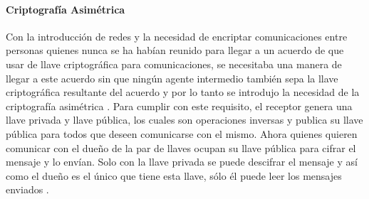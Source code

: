 \paragraph{Criptografía Asimétrica}
Con la introducción de redes y la necesidad de encriptar comunicaciones entre personas quienes nunca se ha habían reunido para llegar a un acuerdo de que usar de llave criptográfica para comunicaciones, se necesitaba una manera de llegar a este acuerdo sin que ningún agente intermedio también sepa la llave criptográfica resultante del acuerdo y por lo tanto se introdujo la necesidad de la criptografía asimétrica \citep{Khanacademy-RSA-1}. Para cumplir con este requisito, el receptor genera una llave privada y llave pública, los cuales son operaciones inversas y publica su llave pública para todos que deseen comunicarse con el mismo. Ahora quienes quieren comunicar con el dueño de la par de llaves ocupan su llave pública para cifrar el mensaje y lo envían. Solo con la llave privada se puede descifrar el mensaje y así como el dueño es el único que tiene esta llave, sólo él puede leer los mensajes enviados \citep{Khanacademy-RSA-1}.

